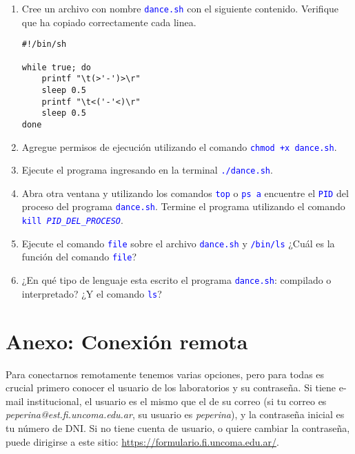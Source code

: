\documentclass[12pt]{article}
\newcommand{\cw}[1]{\mbox{\texttt{\textcolor{blue}{#1}}}}
\begin{document}
\begin{enumerate}[resume]

    \item Cree un archivo con nombre \cw{dance.sh} con el siguiente contenido.
        Verifique que ha copiado correctamente cada linea.

        \begin{verbatim}
#!/bin/sh

while true; do
    printf "\t(>'-')>\r"
    sleep 0.5
    printf "\t<('-'<)\r"
    sleep 0.5
done
        \end{verbatim}

    \item Agregue permisos de ejecución utilizando el comando \cw{chmod +x
        dance.sh}.

    \item Ejecute el programa ingresando en la terminal \cw{./dance.sh}.

    \item Abra otra ventana y utilizando los comandos \cw{top} o \cw{ps a}
        encuentre el \cw{PID} del proceso del programa \cw{dance.sh}.
        Termine el programa utilizando el comando \cw{kill
        \emph{PID\_DEL\_PROCESO}}.

    \item Ejecute el comando \cw{file} sobre el archivo \cw{dance.sh} y
        \cw{/bin/ls} ¿Cuál es la función del comando \cw{file}?

    \item ¿En qué tipo de lenguaje esta escrito el programa \cw{dance.sh}:
        compilado o interpretado? ¿Y el comando \cw{ls}?

\end{enumerate}

\clearpage
\section*{Anexo: Conexión remota}
\label{sec:anexoConexion}

Para conectarnos remotamente tenemos varias opciones, pero para todas es
crucial primero conocer el usuario de los laboratorios y su contraseña. Si
tiene e-mail institucional, el usuario es el mismo que el de su correo (si tu
correo es \emph{peperina@est.fi.uncoma.edu.ar}, su usuario es
\emph{peperina}), y la contraseña inicial es tu número de DNI. Si no tiene
cuenta de usuario, o quiere cambiar la contraseña, puede dirigirse a este
sitio: \url{https://formulario.fi.uncoma.edu.ar/}.
\end{document}
